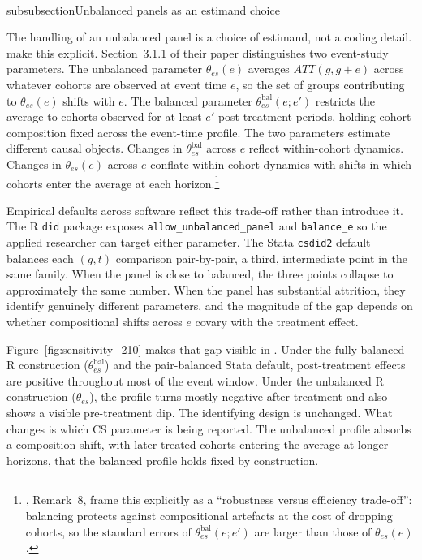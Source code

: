 \documentclass[11pt]{article}
\begin{document}
\\subsubsection{Unbalanced panels as an estimand choice}
\label{sec:li_sensitivity}

The handling of an unbalanced panel is a choice of estimand, not a coding detail. \textcite{callaway2021difference} make this explicit. Section~3.1.1 of their paper distinguishes two event-study parameters. The unbalanced parameter $\theta_{es}(e)$ averages $ATT(g, g+e)$ across whatever cohorts are observed at event time $e$, so the set of groups contributing to $\theta_{es}(e)$ shifts with $e$. The balanced parameter $\theta_{es}^{\mathrm{bal}}(e; e')$ restricts the average to cohorts observed for at least $e'$ post-treatment periods, holding cohort composition fixed across the event-time profile. The two parameters estimate different causal objects. Changes in $\theta_{es}^{\mathrm{bal}}$ across $e$ reflect within-cohort dynamics. Changes in $\theta_{es}(e)$ across $e$ conflate within-cohort dynamics with shifts in which cohorts enter the average at each horizon.\footnote{\textcite{callaway2021difference}, Remark~8, frame this explicitly as a ``robustness versus efficiency trade-off'': balancing protects against compositional artefacts at the cost of dropping cohorts, so the standard errors of $\theta_{es}^{\mathrm{bal}}(e; e')$ are larger than those of $\theta_{es}(e)$.}

Empirical defaults across software reflect this trade-off rather than introduce it. The R \texttt{did} package exposes \texttt{allow\_unbalanced\_panel} and \texttt{balance\_e} so the applied researcher can target either parameter. The Stata \texttt{csdid2} default balances each $(g,t)$ comparison pair-by-pair, a third, intermediate point in the same family. When the panel is close to balanced, the three points collapse to approximately the same number. When the panel has substantial attrition, they identify genuinely different parameters, and the magnitude of the gap depends on whether compositional shifts across $e$ covary with the treatment effect.

Figure~\ref{fig:sensitivity_210} makes that gap visible in \textcite{li2025shortened}. Under the fully balanced R construction ($\theta_{es}^{\mathrm{bal}}$) and the pair-balanced Stata default, post-treatment effects are positive throughout most of the event window. Under the unbalanced R construction ($\theta_{es}$), the profile turns mostly negative after treatment and also shows a visible pre-treatment dip. The identifying design is unchanged. What changes is which CS parameter is being reported. The unbalanced profile absorbs a composition shift, with later-treated cohorts entering the average at longer horizons, that the balanced profile holds fixed by construction.
\end{document}
